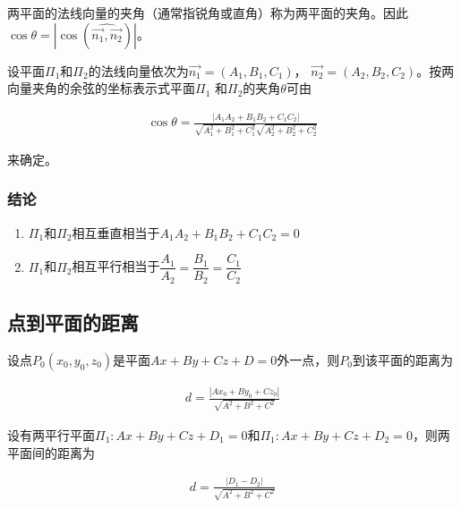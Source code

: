 \documentclass[12pt, a4paper]{article}
\numberwithin{equation}{section}
\begin{document}
    两平面的法线向量的夹角（通常指锐角或直角）称为两平面的夹角。因此\(\cos \theta = \left|\cos
    \left(\hat{\overrightarrow{n_1}, \overrightarrow{n_2}}\right)\right|\)。

    设平面\(\mathit{\Pi_{1}}\)和\(\mathit{\Pi_{2}}\)的法线向量依次为\(\overrightarrow{n_{1}} = \left(A_{1}, B_{1}, C_{1}\right)\)，
    \(\overrightarrow{n_{2}} = \left(A_{2}, B_{2}, C_{2}\right)\)。按两向量夹角的余弦的坐标表示式平面\(\mathit{\Pi_{1}}\)
    和\(\mathit{\Pi_{2}}\)的夹角\(\theta\)可由

    \begin{align}
        \cos \theta=\frac{\left|A_1 A_2+B_1 B_2+C_1 C_2\right|}
        {\sqrt{A_1^2+B_1^2+C_1^2} \sqrt{A_2^2+B_2^2+C_2^2}}
    \end{align}

    来确定。

\subsubsection{结论}

    \begin{enumerate}
        \item \(\mathit{\Pi_{1}}\)和\(\mathit{\Pi_{2}}\)相互垂直相当于\(A_1 A_2+B_1 B_2+C_1 C_2=0\)
        \item \(\mathit{\Pi_{1}}\)和\(\mathit{\Pi_{2}}\)相互平行相当于\(\dfrac{A_1}{A_2}=\dfrac{B_1}{B_2}=\dfrac{C_1}{C_2}\)
    \end{enumerate}

\subsection{点到平面的距离}

    设点\(P_{0}\left(x_0, y_0, z_0\right)\)是平面\(Ax + By + Cz + D = 0\)外一点，则\(P_0\)到该平面的距离为

    \begin{align}
        d=\frac{\left|A x_0+B y_0+C z_0\right|}{\sqrt{A^2+B^2+C^2}}
    \end{align}

    设有两平行平面\(\mathit{\Pi_{1}}: Ax + By +Cz +D_1 = 0\)和\(\mathit{\Pi_{1}}: Ax + By +Cz +D_2 = 0\)，则两平面间的距离为

    \begin{align}
        d=\frac{\left|D_1 - D_2\right|}{\sqrt{A^2+B^2+C^2}}
    \end{align}
\end{document}
